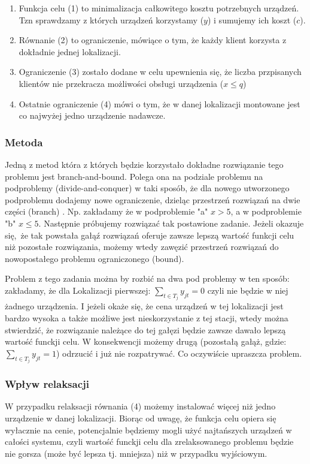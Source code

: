 \documentclass{article}
\begin{document}
\begin{enumerate}
  \item Funkcja celu (1) to minimalizacja całkowitego kosztu potrzebnych urządzeń. Tzn sprawdzamy z których urządzeń korzystamy ($y$) i sumujemy ich koszt ($c$).
  \item Równanie (2) to ograniczenie, mówiące o tym, że każdy klient korzysta z dokładnie jednej lokalizacji.
  \item Ograniczenie (3) zostało dodane w celu upewnienia się, że liczba przpisanych klientów nie przekracza możliwości obsługi urządzenia ($x \leq q$)
  \item Ostatnie ograniczenie (4) mówi o tym, że w danej lokalizacji montowane jest co najwyżej jedno urządzenie nadawcze.
\end{enumerate}

\subsubsection{Metoda}

Jedną z metod która z których będzie korzystało dokładne rozwiązanie tego problemu jest branch-and-bound.
Polega ona na podziale problemu na podproblemy (divide-and-conquer) w taki sposób, że dla nowego utworzonego podproblemu
dodajemy nowe ograniczenie, dzieląc przestrzeń rozwiązań na dwie części (branch) . Np. zakładamy że w podproblemie "a" $x > 5$, a w podproblemie "b" $x \leq 5$.
Następnie próbujemy rozwiązać tak postawione zadanie. Jeżeli okazuje się, że tak powstała gałąź rozwiązań oferuje zawsze lepszą wartość funkcji
celu niż pozostałe rozwiązania, możemy wtedy zawęzić przestrzeń rozwiązań do nowopostałego problemu ograniczonego (bound).

Problem z tego zadania można by rozbić na dwa pod problemy w ten sposób:
zakładamy, że dla Lokalizacji pierwszej: $\sum_{t \in T_j} y_{jt} = 0$ czyli nie będzie w niej żadnego urządzenia.
I jeżeli okaże się, że cena urządzeń w tej lokalizacji jest bardzo wysoka a także możliwe jest nieskorzystanie z tej stacji,
wtedy można stwierdzić, że rozwiązanie należące do tej gałęzi będzie zawsze dawało lepszą wartość funckji celu. W konsekwencji możemy
drugą (pozostałą gałąż, gdzie: $\sum_{t \in T_j} y_{jt} = 1$) odrzucić i już nie rozpatrywać. Co oczywiście upraszcza problem.

\subsubsection{Wpływ relaksacji}
W przypadku relaksacji równania (4) możemy instalować więcej niż jedno urządzenie w danej lokalizacji. Biorąc od uwagę, że funkcja celu
opiera się wyłacznie na cenie, potencjalnie będziemy mogli użyć najtańszych urządzeń w całości systemu, czyli wartość funckji celu dla zrelaksowanego
problemu będzie nie gorsza (może być lepsza tj. mniejsza) niż w przypadku wyjściowym.
\end{document}
